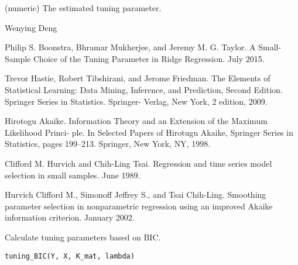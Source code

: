 \documentclass[a4paper]{book}
\begin{document}
%
\begin{Details}\relax
{}

\end{Details}
%
\begin{Value}
\begin{ldescription}
\item[\code{lambda0}] (numeric) The estimated tuning parameter.
\end{ldescription}
\end{Value}
%
\begin{Author}\relax
Wenying Deng
\end{Author}
%
\begin{References}\relax
Philip S. Boonstra, Bhramar Mukherjee, and Jeremy M. G. Taylor.
A Small-Sample Choice of the Tuning Parameter in Ridge Regression. July
2015.

Trevor Hastie, Robert Tibshirani, and Jerome Friedman. The Elements of
Statistical Learning: Data Mining, Inference, and Prediction, Second
Edition. Springer Series in Statistics. Springer- Verlag, New York, 2
edition, 2009.

Hirotogu Akaike. Information Theory and an Extension of the Maximum
Likelihood Princi- ple. In Selected Papers of Hirotugu Akaike, Springer
Series in Statistics, pages 199–213. Springer, New York, NY, 1998.

Clifford M. Hurvich and Chih-Ling Tsai. Regression and time series model
selection in small samples. June 1989.

Hurvich Clifford M., Simonoff Jeffrey S., and Tsai Chih-Ling. Smoothing
parameter selection in nonparametric regression using an improved Akaike
information criterion. January 2002.
\end{References}
%
\begin{Description}\relax
Calculate tuning parameters based on BIC.
\end{Description}
%
\begin{Usage}
\begin{verbatim}
tuning_BIC(Y, X, K_mat, lambda)
\end{verbatim}
\end{Usage}
%
\end{document}

